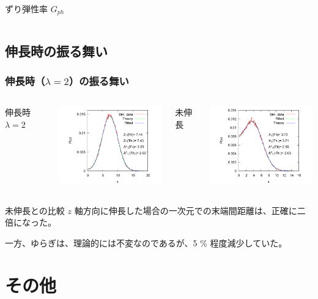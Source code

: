 \documentclass[11pt, dvipdfmx]{beamer}
\begin{document}
\begin{appendix}
\begin{frame}
\begin{columns}[totalwidth=1\textwidth]
\begin{block}{ずり弾性率 $G_{ph}$}
\end{block}
\end{columns}

\end{frame}




\subsection{伸長時の振る舞い}
\begin{frame}
\frametitle{伸長時（$\lambda =2$）の振る舞い}

\begin{columns}[T, totalwidth=0.96\linewidth]

伸長時 $\lambda =2$

\includegraphics[width=55mm]{./fig/L2_Rz.pdf}

未伸長

\includegraphics[width=55mm]{./fig/L1_Rx.pdf}
\end{columns}

\small
\begin{exampleblock}{未伸長との比較}
$z$ 軸方向に伸長した場合の一次元での末端間距離は、正確に二倍になった。

一方、ゆらぎは、理論的には不変なのであるが、5 \% 程度減少していた。
\end{exampleblock}

\end{frame}

\section{その他}



\end{appendix}
\end{document}
